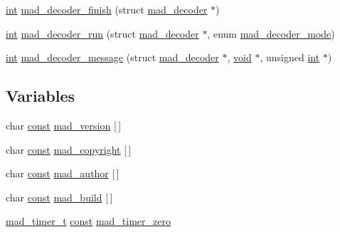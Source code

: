 \begin{DoxyCompactItemize}
\hyperlink{xmltok_8h_a5a0d4a5641ce434f1d23533f2b2e6653}{int} \hyperlink{mac_2config_2i386_2lib-src_2libmad_2mad_8h_a56b468fcf675abe04387436810a07fda}{mad\+\_\+decoder\+\_\+finish} (struct \hyperlink{structmad__decoder}{mad\+\_\+decoder} $\ast$)
\item 
\hyperlink{xmltok_8h_a5a0d4a5641ce434f1d23533f2b2e6653}{int} \hyperlink{mac_2config_2i386_2lib-src_2libmad_2mad_8h_a15bcb1ee95b6b65d8ec4d54a018c2bbf}{mad\+\_\+decoder\+\_\+run} (struct \hyperlink{structmad__decoder}{mad\+\_\+decoder} $\ast$, enum \hyperlink{libmad_2decoder_8h_a0d55d67e9f9acf69f677f86053e88b6a}{mad\+\_\+decoder\+\_\+mode})
\item 
\hyperlink{xmltok_8h_a5a0d4a5641ce434f1d23533f2b2e6653}{int} \hyperlink{mac_2config_2i386_2lib-src_2libmad_2mad_8h_a6ab2b36ad800331d9199cef327116c27}{mad\+\_\+decoder\+\_\+message} (struct \hyperlink{structmad__decoder}{mad\+\_\+decoder} $\ast$, \hyperlink{sound_8c_ae35f5844602719cf66324f4de2a658b3}{void} $\ast$, unsigned \hyperlink{xmltok_8h_a5a0d4a5641ce434f1d23533f2b2e6653}{int} $\ast$)
\end{DoxyCompactItemize}
\subsection*{Variables}
\begin{DoxyCompactItemize}
\item 
char \hyperlink{getopt1_8c_a2c212835823e3c54a8ab6d95c652660e}{const} \hyperlink{mac_2config_2i386_2lib-src_2libmad_2mad_8h_a591cc8ef08e7a4aa760dd39c3b2ac6fd}{mad\+\_\+version} \mbox{[}$\,$\mbox{]}
\item 
char \hyperlink{getopt1_8c_a2c212835823e3c54a8ab6d95c652660e}{const} \hyperlink{mac_2config_2i386_2lib-src_2libmad_2mad_8h_a96d0c229655b816cb04a849560ceb61d}{mad\+\_\+copyright} \mbox{[}$\,$\mbox{]}
\item 
char \hyperlink{getopt1_8c_a2c212835823e3c54a8ab6d95c652660e}{const} \hyperlink{mac_2config_2i386_2lib-src_2libmad_2mad_8h_a91fd9056faedd006c829818a4865c93c}{mad\+\_\+author} \mbox{[}$\,$\mbox{]}
\item 
char \hyperlink{getopt1_8c_a2c212835823e3c54a8ab6d95c652660e}{const} \hyperlink{mac_2config_2i386_2lib-src_2libmad_2mad_8h_a11104a46f15ac68091f712bda8e0673a}{mad\+\_\+build} \mbox{[}$\,$\mbox{]}
\item 
\hyperlink{structmad__timer__t}{mad\+\_\+timer\+\_\+t} \hyperlink{getopt1_8c_a2c212835823e3c54a8ab6d95c652660e}{const} \hyperlink{mac_2config_2i386_2lib-src_2libmad_2mad_8h_a99b7db3d65e6508fc9952f421c08e6a6}{mad\+\_\+timer\+\_\+zero}
\end{DoxyCompactItemize}


